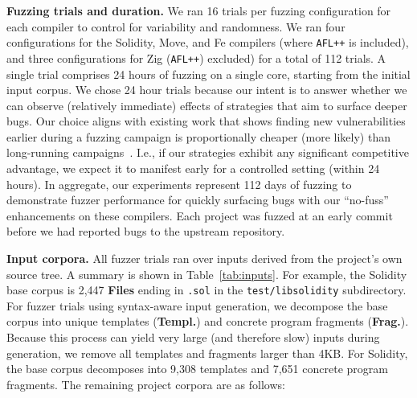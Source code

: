 \noindent \textbf{Fuzzing trials and duration.} We ran 16 trials per fuzzing
configuration for each compiler to control for variability and randomness.  We
ran four configurations for the Solidity, Move, and Fe compilers (where
\texttt{AFL++} is included), and three configurations for Zig (\texttt{AFL++})
excluded) for a total of 112 trials.  A single trial comprises 24 hours of
fuzzing on a single core, starting from the initial input corpus.  
We chose 24 hour trials because our intent is to
answer whether we can observe (relatively immediate) effects of strategies that
aim to surface deeper bugs.  Our choice aligns with existing work that shows
finding new vulnerabilities earlier during a fuzzing campaign is proportionally
cheaper (more likely) than long-running campaigns~\cite{fuzzexp}. I.e., if our
strategies exhibit any significant competitive advantage, we expect it
to manifest
early for a controlled setting (within 24 hours).  In aggregate, our
experiments represent 112 days of fuzzing to demonstrate fuzzer performance for
quickly surfacing bugs with our ``no-fuss'' enhancements on these compilers.
Each project was fuzzed at an early commit before we had reported bugs to the
upstream repository.

\noindent 
\textbf{Input corpora.} All fuzzer trials ran over inputs derived from the
project's own source tree. A summary is shown in Table~\ref{tab:inputs}. For
example, the Solidity base corpus is 2,447 \textbf{Files} ending in
\texttt{.sol} in the \texttt{test/libsolidity} subdirectory.  For fuzzer trials
using syntax-aware input generation, we decompose the base corpus into unique
templates (\textbf{Templ.}) and concrete program fragments (\textbf{Frag.}).
Because this process can yield very large (and therefore slow) inputs during
generation, we remove all templates and fragments larger than 4KB.  For
Solidity, the base corpus decomposes into 9,308 templates and 7,651 concrete
program fragments.  The remaining project corpora are as follows:

